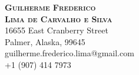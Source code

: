 \documentclass[11pt,a4paper]{article}
\begin{document}
\makeatletter
 \renewcommand{\@evenhead}{\textit{G. F. Lima de Carvalho e Silva CV continued...}\hfil}
 \renewcommand{\@oddhead}{\@evenhead}
 \renewcommand{\@evenfoot}{\hfil \thepage\ of\  \pageref{LastPage}\hfil}
 \renewcommand{\@oddfoot}{\@evenfoot}
\makeatother



\thispagestyle{empty}
\begin{center}
{\huge\textbf{\textsc{Guilherme Frederico \\[3mm] Lima de Carvalho e Silva}}} \\ \vspace{0.5cm}
{\color{darkgray}16655 East Cranberry Street \\ Palmer, Alaska, 99645 \\
  guilherme.frederico.lima@gmail.com \\ +1 (907) 414 7973}
\end{center}
\vspace{0.5cm}


\end{document}
